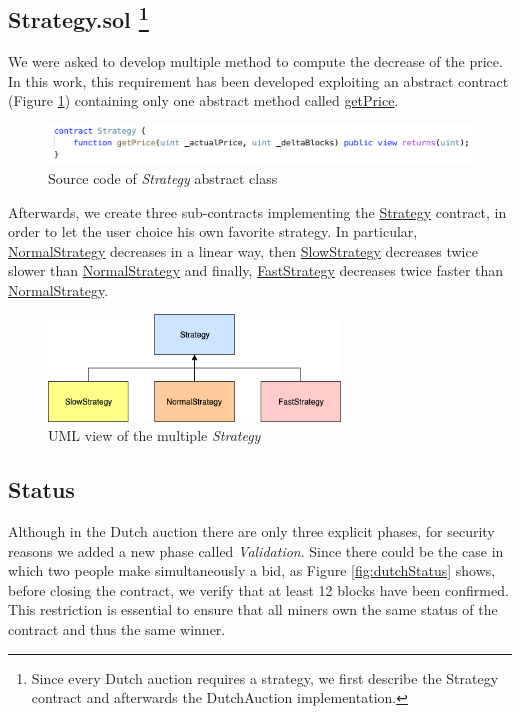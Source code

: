 \documentclass[runningheads,a4paper]{llncs}
\begin{document}
\newpage
\subsection{Strategy.sol \protect\footnote{Since every Dutch auction requires a strategy, we first describe the Strategy contract and afterwards the DutchAuction implementation.}}

We were asked to develop multiple method to compute the decrease of the price. In this work, this requirement has been developed exploiting an abstract contract (Figure \ref{fig:strategycode}) containing only one abstract method called \url{getPrice}.

\begin{figure}[h]
\includegraphics[width=\linewidth]{images/strategycode.png}
\centering
\caption{Source code of \emph{Strategy} abstract class}
\label{fig:strategycode}
\end{figure}

Afterwards, we create three sub-contracts implementing the \url{Strategy} contract, in order to let the user choice his own favorite strategy. In particular, \url{NormalStrategy} decreases in a linear way, then \url{SlowStrategy} decreases twice slower than \url{NormalStrategy} and finally, \url{FastStrategy} decreases twice faster than \url{NormalStrategy}.

\begin{figure}[h]
\includegraphics[width=220pt]{images/strategyUML.png}
\centering
\caption{UML view of the multiple \emph{Strategy}}
\label{fig:strategyUML}
\end{figure}

\newpage
\subsection{Status} \label{status}
Although in the Dutch auction there are only three explicit phases, for security reasons we added a new phase called \emph{Validation}. Since there could be the case in which two people make simultaneously a bid, as Figure \ref{fig:dutchStatus} shows, before closing the contract, we verify that at least 12 blocks \cite{ethBlog} have been confirmed. This restriction is essential to ensure that all miners own the same status of the contract and thus the same winner.
\end{document}
